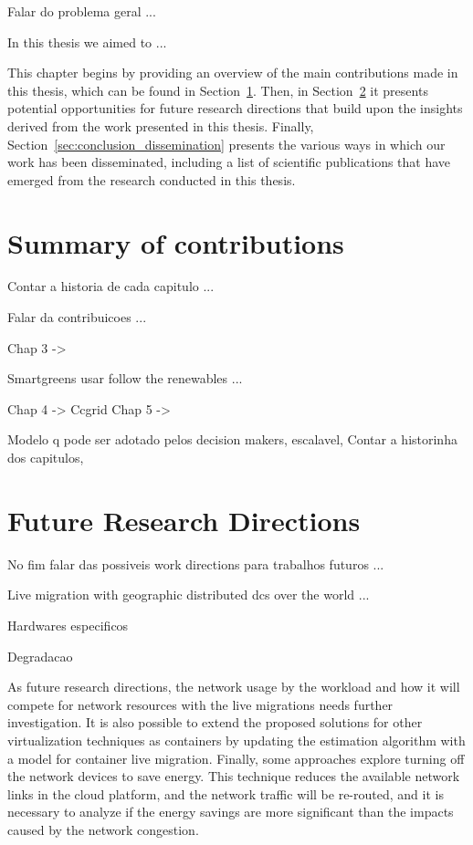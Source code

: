 
Falar do problema geral ...

In this thesis we aimed to ...


This chapter begins by providing an overview of the main contributions made in this thesis, which can be found in Section~\ref{sec:conclusion_summary}. Then, in Section~\ref{sec:conclusion_future_research} it presents potential opportunities for future research directions that build upon the insights derived from the work presented in this thesis. Finally, Section~\ref{sec:conclusion_dissemination} presents the various ways in which our work has been disseminated, including a list of scientific publications that have emerged from the research conducted in this thesis.

\section{Summary of contributions }

\label{sec:conclusion_summary}

Contar a historia de cada capitulo ...

Falar da contribuicoes ...

Chap 3 ->

Smartgreens usar follow the renewables ...

Chap 4 ->
Ccgrid 
Chap 5 ->

Modelo q pode ser adotado pelos decision makers, escalavel, 
Contar a historinha dos capitulos,


\section{Future Research Directions}
\label{sec:conclusion_future_research}

No fim falar das possiveis work directions para trabalhos futuros ...

Live migration with geographic distributed dcs over the world ...

Hardwares especificos

Degradacao

As future research directions, the network usage by the workload and how it will compete for network resources with the live migrations needs further investigation. It is also possible to extend the proposed solutions for other virtualization techniques as containers by updating the estimation algorithm with a model for container live migration. Finally, some approaches explore turning off the network devices to save energy. This technique reduces the available network links in the cloud platform, and the network traffic will be re-routed, and it is necessary to analyze if the energy savings are more significant than the impacts caused by the network congestion.



